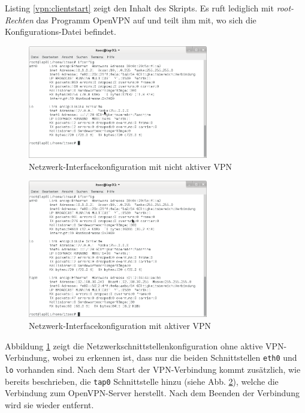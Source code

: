 Listing \ref{vpn:clientstart} zeigt den Inhalt des Skripts. Es ruft lediglich mit \emph{root-Rechten} das Programm OpenVPN auf und teilt ihm mit, wo sich die Konfigurations-Datei befindet.

\begin{figure}[h!]
  \centering
    \includegraphics[width=0.7\textwidth]{figures/vpn_ifconfig_lap01.png}
  \caption{Netzwerk-Interfacekonfiguration mit nicht aktiver VPN}
  \label{vpn:screenshot_ifconfig1}
\end{figure}

\begin{figure}[h!]
  \centering
    \includegraphics[width=0.7\textwidth]{figures/vpn_ifconfig_lap01_vpn.png}
  \caption{Netzwerk-Interfacekonfiguration mit aktiver VPN}
  \label{vpn:screenshot_ifconfig2}
\end{figure}


Abbildung \ref{vpn:screenshot_ifconfig1} zeigt die Netzwerkschnittstellenkonfiguration ohne aktive VPN-Verbindung, wobei zu erkennen ist, dass nur die beiden Schnittstellen \texttt{eth0} und \texttt{lo} vorhanden sind. Nach dem Start der VPN-Verbindung kommt zusätzlich, wie bereits beschrieben, die \texttt{tap0} Schnittstelle hinzu (siehe Abb. \ref{vpn:screenshot_ifconfig2}), welche die Verbindung zum OpenVPN-Server herstellt. Nach dem Beenden der Verbindung wird sie wieder entfernt.